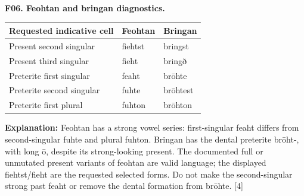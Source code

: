 \par\begin{minipage}{\linewidth}\raggedright
\textbf{F06. Feohtan and bringan diagnostics.}

\par\begingroup
\fontsize{10.5}{13.2}\selectfont
\setlength{\LTleft}{0pt}\setlength{\LTright}{\fill}
\noindent
\begin{tabular}{@{}>{\raggedright\arraybackslash}p{53.95mm}>{\raggedright\arraybackslash}p{32.21mm}>{\raggedright\arraybackslash}p{32.21mm}@{}}
\toprule
\textbf{Requested indicative cell} & \textbf{Feohtan} & \textbf{Bringan} \\
\midrule
Present second singular & fiehtst & bringst \\
Present third singular & fieht & bringð \\
Preterite first singular & feaht & brōhte \\
Preterite second singular & fuhte & brōhtest \\
Preterite first plural & fuhton & brōhton \\
\bottomrule
\end{tabular}
\par\endgroup

\textbf{Explanation:} Feohtan has a strong vowel series: first-singular feaht differs from second-singular fuhte and plural fuhton. Bringan has the dental preterite brōht-, with long ō, despite its strong-looking present. The documented full or unmutated present variants of feohtan are valid language; the displayed fiehtst/\allowbreak{}fieht are the requested selected forms. Do not make the second-singular strong past feaht or remove the dental formation from brōhte. [4]

\end{minipage}\par\addvspace{4pt}

